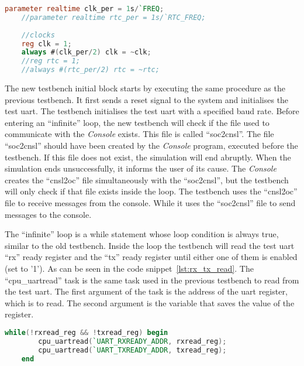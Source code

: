 \begin{lstlisting}[language=Verilog, caption={System clock and \acrshort{rtc} generation in \textit{Verilog}.}, label=lst:clk_rtc_gen]
    parameter realtime clk_per = 1s/`FREQ;
    //parameter realtime rtc_per = 1s/`RTC_FREQ;
 
    //clocks
    reg clk = 1;
    always #(clk_per/2) clk = ~clk;
    //reg rtc = 1;
    //always #(rtc_per/2) rtc = ~rtc;
\end{lstlisting}

The new testbench initial block starts by executing the same procedure as the previous testbench. It first sends a reset signal to the system and initialises the test \acrshort{uart}. The testbench initialises the test \acrshort{uart} with a specified baud rate. Before entering an \enquote{infinite} loop, the new testbench will check if the file used to communicate with the \textit{Console} exists. This file is called \enquote{soc2cnsl}. The file \enquote{soc2cnsl} should have been created by the \textit{Console} program, executed before the testbench. If this file does not exist, the simulation will end abruptly. When the simulation ends unsuccessfully, it informs the user of its cause. The \textit{Console} creates the \enquote{cnsl2oc} file simultaneously with the \enquote{soc2cnsl}, but the testbench will only check if that file exists inside the loop. The testbench uses the \enquote{cnsl2oc} file to receive messages from the console. While it uses the \enquote{soc2cnsl} file to send messages to the console.

The \enquote{infinite} loop is a while statement whose loop condition is always true, similar to the old testbench. Inside the loop the testbench will read the test \acrshort{uart} \enquote{rx} ready register and the \enquote{tx} ready register until either one of them is enabled (set to '1'). As can be seen in the code snippet~\ref{lst:rx_tx_read}. The \enquote{cpu\_uartread} task is the same task used in the previous testbench to read from the test \acrshort{uart}. The first argument of the task is the address of the \acrshort{uart} register, which is to read. The second argument is the variable that saves the value of the register.

\begin{lstlisting}[language=Verilog, caption={Read the test \acrshort{uart} \enquote{rx} ready register and the \enquote{tx} ready register.}, label=lst:rx_tx_read]
    while(!rxread_reg && !txread_reg) begin
        cpu_uartread(`UART_RXREADY_ADDR, rxread_reg);
        cpu_uartread(`UART_TXREADY_ADDR, txread_reg);
    end
\end{lstlisting}

